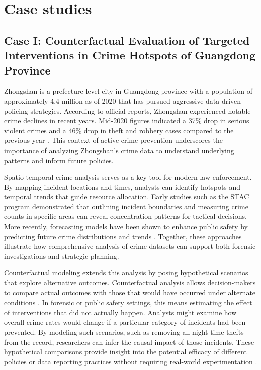 
\section{Case studies}

\subsection{Case I: Counterfactual Evaluation of Targeted Interventions in Crime Hotspots of Guangdong Province}

Zhongshan is a prefecture-level city in Guangdong province with a population of approximately 4.4 million as of 2020 that has pursued aggressive data-driven policing strategies. According to official reports, Zhongshan experienced notable crime declines in recent years. Mid-2020 figures indicated a 37\% drop in serious violent crimes and a 46\% drop in theft and robbery cases compared to the previous year \cite{Zhongshan2020}. This context of active crime prevention underscores the importance of analyzing Zhongshan's crime data to understand underlying patterns and inform future policies.

Spatio-temporal crime analysis serves as a key tool for modern law enforcement. By mapping incident locations and times, analysts can identify hotspots and temporal trends that guide resource allocation. Early studies such as the STAC program demonstrated that outlining incident boundaries and measuring crime counts in specific areas can reveal concentration patterns for tactical decisions. More recently, forecasting models have been shown to enhance public safety by predicting future crime distributions and trends \cite{Li2024UrbanGPT}. Together, these approaches illustrate how comprehensive analysis of crime datasets can support both forensic investigations and strategic planning.

Counterfactual modeling extends this analysis by posing hypothetical scenarios that explore alternative outcomes. Counterfactual analysis allows decision-makers to compare actual outcomes with those that would have occurred under alternate conditions \cite{CONSTANTINOU201641}. In forensic or public safety settings, this means estimating the effect of interventions that did not actually happen. Analysts might examine how overall crime rates would change if a particular category of incidents had been prevented. By modeling such scenarios, such as removing all night-time thefts from the record, researchers can infer the causal impact of those incidents. These hypothetical comparisons provide insight into the potential efficacy of different policies or data reporting practices without requiring real-world experimentation \cite{CONSTANTINOU201641}.

